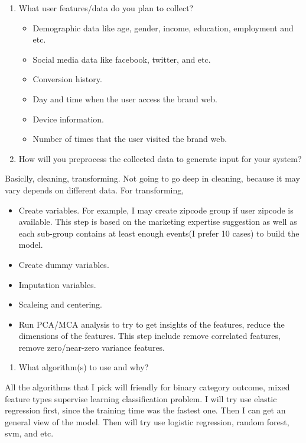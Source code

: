 \documentclass[]{article}
\providecommand{\tightlist}{%
  \setlength{\itemsep}{0pt}\setlength{\parskip}{0pt}}
\begin{document}
\begin{enumerate}
\def\labelenumi{\arabic{enumi}.}
\setcounter{enumi}{2}
\tightlist
\item
  What user features/data do you plan to collect?

  \begin{itemize}
  \tightlist
  \item
    Demographic data like age, gender, income, education, employment and
    etc.
  \item
    Social media data like facebook, twitter, and etc.
  \item
    Conversion history.
  \item
    Day and time when the user access the brand web.
  \item
    Device information.
  \item
    Number of times that the user visited the brand web.
  \end{itemize}
\item
  How will you preprocess the collected data to generate input for your
  system?
\end{enumerate}

Basiclly, cleaning, transforming. Not going to go deep in cleaning,
because it may vary depends on different data. For transforming,

\begin{itemize}
\tightlist
\item
  Create variables. For example, I may create zipcode group if user
  zipcode is available. This step is based on the marketing expertise
  suggestion as well as each sub-group contains at least enough events(I
  prefer 10 cases) to build the model.
\item
  Create dummy variables.
\item
  Imputation variables.
\item
  Scaleing and centering.
\item
  Run PCA/MCA analysis to try to get insights of the features, reduce
  the dimensions of the features. This step include remove correlated
  features, remove zero/near-zero variance features.
\end{itemize}

\begin{enumerate}
\def\labelenumi{\arabic{enumi}.}
\setcounter{enumi}{4}
\tightlist
\item
  What algorithm(s) to use and why?
\end{enumerate}

All the algorithms that I pick will friendly for binary category
outcome, mixed feature types supervise learning classification problem.
I will try use elastic regression first, since the training time was the
fastest one. Then I can get an general view of the model. Then will try
use logistic regression, random forest, svm, and etc.
\end{document}
